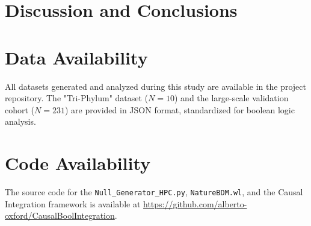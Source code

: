 \documentclass[10pt,a4paper]{article}
\theoremstyle{plain}
\theoremstyle{definition}
\theoremstyle{remark}
\begin{document}
\section{Discussion and Conclusions}


\appendix
\section{Data Availability}
All datasets generated and analyzed during this study are available in the project repository. The "Tri-Phylum" dataset ($N=10$) and the large-scale validation cohort ($N=231$) are provided in JSON format, standardized for boolean logic analysis.

\section{Code Availability}
The source code for the \texttt{Null\_Generator\_HPC.py}, \texttt{NatureBDM.wl}, and the Causal Integration framework is available at \url{https://github.com/alberto-oxford/CausalBoolIntegration}.

\printbibliography
\end{document}
